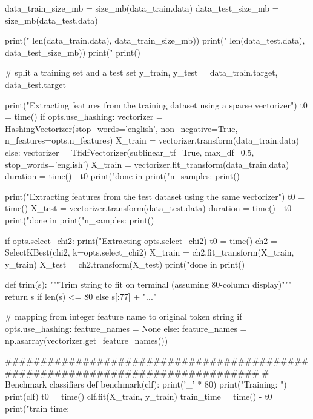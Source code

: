 \begin{pyverbatim}
data_train_size_mb = size_mb(data_train.data)
data_test_size_mb = size_mb(data_test.data)

print("%
    len(data_train.data), data_train_size_mb))
print("%
    len(data_test.data), data_test_size_mb))
print("%
print()

# split a training set and a test set
y_train, y_test = data_train.target, data_test.target

print("Extracting features from the training dataset using a sparse vectorizer")
t0 = time()
if opts.use_hashing:
    vectorizer = HashingVectorizer(stop_words='english', non_negative=True,
                                   n_features=opts.n_features)
    X_train = vectorizer.transform(data_train.data)
else:
    vectorizer = TfidfVectorizer(sublinear_tf=True, max_df=0.5,
                                 stop_words='english')
    X_train = vectorizer.fit_transform(data_train.data)
duration = time() - t0
print("done in %
print("n_samples: %
print()

print("Extracting features from the test dataset using the same vectorizer")
t0 = time()
X_test = vectorizer.transform(data_test.data)
duration = time() - t0
print("done in %
print("n_samples: %
print()

if opts.select_chi2:
    print("Extracting %
          opts.select_chi2)
    t0 = time()
    ch2 = SelectKBest(chi2, k=opts.select_chi2)
    X_train = ch2.fit_transform(X_train, y_train)
    X_test = ch2.transform(X_test)
    print("done in %
    print()


def trim(s):
    """Trim string to fit on terminal (assuming 80-column display)"""
    return s if len(s) <= 80 else s[:77] + "..."


# mapping from integer feature name to original token string
if opts.use_hashing:
    feature_names = None
else:
    feature_names = np.asarray(vectorizer.get_feature_names())


###############################################################################
# Benchmark classifiers
def benchmark(clf):
    print('_' * 80)
    print("Training: ")
    print(clf)
    t0 = time()
    clf.fit(X_train, y_train)
    train_time = time() - t0
    print("train time: %


\end{pyverbatim}
